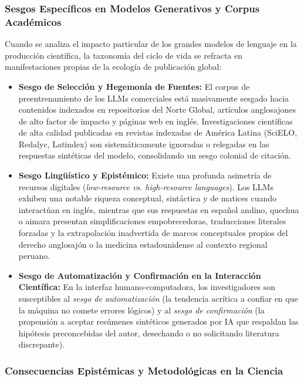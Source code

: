 \subsubsection{Sesgos Específicos en Modelos Generativos y Corpus Académicos}

Cuando se analiza el impacto particular de los grandes modelos de lenguaje en la producción científica, la taxonomía del ciclo de vida se refracta en manifestaciones propias de la ecología de publicación global:

\begin{itemize}
    \item \textbf{Sesgo de Selección y Hegemonía de Fuentes:} El corpus de preentrenamiento de los LLMs comerciales está masivamente sesgado hacia contenidos indexados en repositorios del Norte Global, artículos anglosajones de alto factor de impacto y páginas web en inglés. Investigaciones científicas de alta calidad publicadas en revistas indexadas de América Latina (SciELO, Redalyc, Latindex) son sistemáticamente ignoradas o relegadas en las respuestas sintéticas del modelo, consolidando un sesgo colonial de citación.
    \item \textbf{Sesgo Lingüístico y Epistémico:} Existe una profunda asimetría de recursos digitales (\textit{low-resource vs. high-resource languages}). Los LLMs exhiben una notable riqueza conceptual, sintáctica y de matices cuando interactúan en inglés, mientras que sus respuestas en español andino, quechua o aimara presentan simplificaciones empobrecedoras, traducciones literales forzadas y la extrapolación inadvertida de marcos conceptuales propios del derecho anglosajón o la medicina estadounidense al contexto regional peruano.
    \item \textbf{Sesgo de Automatización y Confirmación en la Interacción Científica:} En la interfaz humano-computadora, los investigadores son susceptibles al \textit{sesgo de automatización} (la tendencia acrítica a confiar en que la máquina no comete errores lógicos) y al \textit{sesgo de confirmación} (la propensión a aceptar resúmenes sintéticos generados por IA que respaldan las hipótesis preconcebidas del autor, desechando o no solicitando literatura discrepante).
\end{itemize}

\subsubsection{Consecuencias Epistémicas y Metodológicas en la Ciencia}

